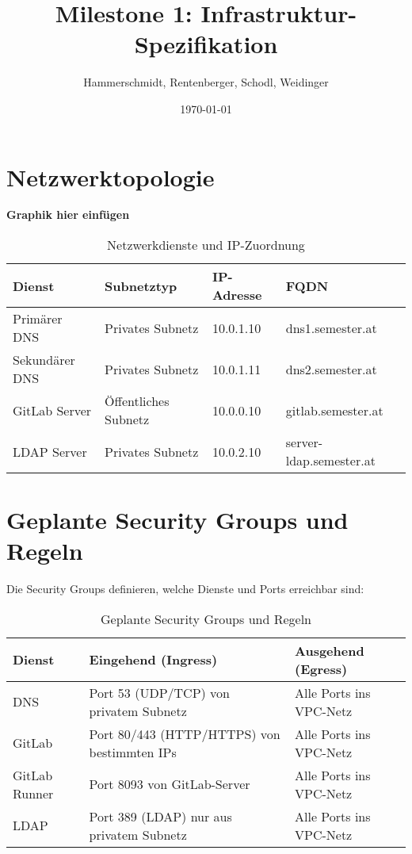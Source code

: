 \documentclass[a4paper,12pt]{article}
\title{Milestone 1: Infrastruktur-Spezifikation}
\author{Hammerschmidt, Rentenberger, Schodl, Weidinger}
\date{\today}
\begin{document}
\maketitle
\tableofcontents
\newpage

\section{Netzwerktopologie}

\textbf{Graphik hier einfügen}

\begin{table}[h!]
    \centering
    \begin{tabular}{|l|l|l|l|}
    \hline
    \textbf{Dienst}          & \textbf{Subnetztyp}      & \textbf{IP-Adresse} & \textbf{FQDN}             \\ \hline
    Primärer DNS             & Privates Subnetz         & 10.0.1.10                & dns1.semester.at         \\ \hline
    Sekundärer DNS           & Privates Subnetz         & 10.0.1.11                & dns2.semester.at         \\ \hline
    GitLab Server            & Öffentliches Subnetz     & 10.0.0.10                & gitlab.semester.at       \\ \hline
    LDAP Server              & Privates Subnetz         & 10.0.2.10                & server-ldap.semester.at         \\ \hline
    \end{tabular}
    \caption{Netzwerkdienste und IP-Zuordnung}
\end{table}

\section{Geplante Security Groups und Regeln}
Die Security Groups definieren, welche Dienste und Ports erreichbar sind:

\begin{table}[h!]
    \centering
    \begin{tabular}{|l|l|l|}
    \hline
    \textbf{Dienst}      & \textbf{Eingehend (Ingress)}          & \textbf{Ausgehend (Egress)}         \\ \hline
    DNS                 & Port 53 (UDP/TCP) von privatem Subnetz & Alle Ports ins VPC-Netz             \\ \hline
    GitLab              & Port 80/443 (HTTP/HTTPS) von bestimmten IPs & Alle Ports ins VPC-Netz             \\ \hline
    GitLab Runner       & Port 8093 von GitLab-Server            & Alle Ports ins VPC-Netz             \\ \hline
    LDAP                & Port 389 (LDAP) nur aus privatem Subnetz & Alle Ports ins VPC-Netz             \\ \hline
    \end{tabular}
    \caption{Geplante Security Groups und Regeln}
\end{table}
\end{document}
